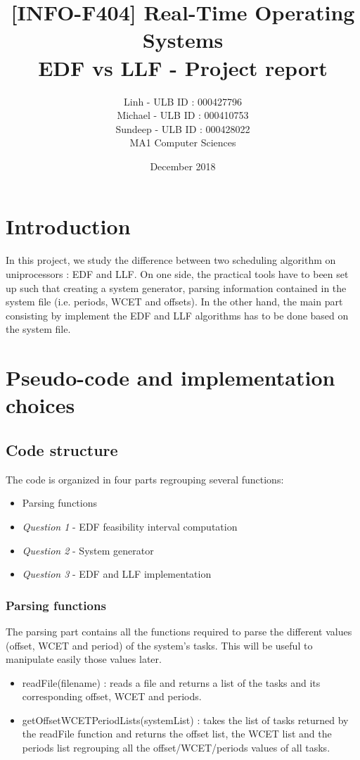 \documentclass{article}
\title{[INFO-F404] Real-Time Operating Systems \\ EDF vs LLF - Project report}
\author{\bsc{BUI QUANG PHUONG} Linh - ULB ID : 000427796 \\ \bsc{PAQUET} Michael - ULB ID : 000410753 \\ \bsc{SINGH} Sundeep - ULB ID : 000428022 \\ MA1 Computer Sciences}
\date{December 2018}
\begin{document}
\maketitle

\section*{Introduction}
In this project, we study the difference between two scheduling algorithm on uniprocessors : EDF and LLF. On one side, the practical tools have to been set up such that creating a system generator, parsing information contained in the system file (i.e. periods, WCET and offsets). In the other hand, the main part consisting by implement the EDF and LLF algorithms has to be done based on the system file. 

\section{Pseudo-code and implementation choices}

\subsection{Code structure}
The code is organized in four parts regrouping several functions:  
\begin{itemize}
    \item Parsing functions 
    \item \textit{Question 1} - EDF feasibility interval computation 
    \item \textit{Question 2} - System generator 
    \item \textit{Question 3} - EDF and LLF implementation 
\end{itemize}

\subsubsection{Parsing functions}
The parsing part contains all the functions required to parse the different values (offset, WCET and period) of the system's tasks. This will be useful to manipulate easily those values later.  
\begin{itemize}
    \item {\selectfont readFile(filename)} : reads a file and returns a list of the tasks and its corresponding offset, WCET and periods. 
    \item {\selectfont getOffsetWCETPeriodLists(systemList)} : takes the list of tasks returned by the {\selectfont readFile} function and returns the offset list, the WCET list and the periods list regrouping all the offset/WCET/periods values of all tasks.
\end{itemize}
\end{document}

